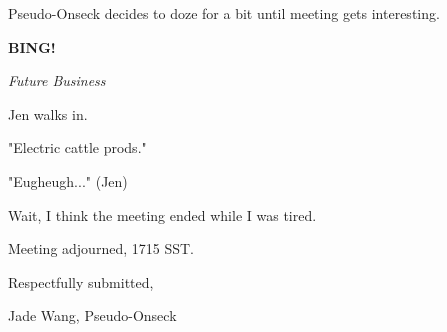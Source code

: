\documentclass[12pt]{article}
\newcommand{\bing}{{\bf BING!} }
\newcommand{\goto}[1]{\bing \vskip 12pt \centerline{{\em{#1}}}}
\begin{document}
Pseudo-Onseck decides to doze for a bit until meeting gets interesting.

\goto{Future Business}

Jen walks in.

"Electric cattle prods."

"Eugheugh..." (Jen)

Wait, I think the meeting ended while I was tired.

\vspace{12pt}

\noindent
Meeting adjourned, 1715 SST.

\vspace{18pt}

\centerline{Respectfully submitted,}
\centerline{Jade Wang, Pseudo-Onseck}
\end{document}

